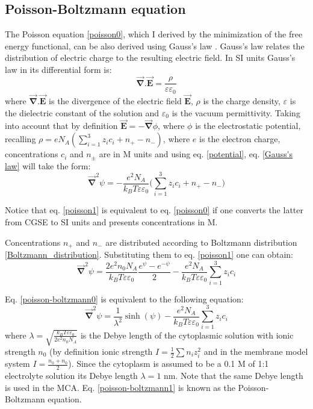 \subsection{Poisson-Boltzmann equation}

The Poisson equation \eqref{poisson0}, which I derived by the minimization of the free energy functional, can be also derived using Gauss's law \cite{Jackson1999}. Gauss's law relates the distribution of electric charge to the resulting electric field. In SI units Gauss's law in its differential form is:
\begin{equation}
 \label{Gauss's law}\vec{\mathbf{\nabla}}. \vec{\mathbf{E}} = \frac{\rho}{\varepsilon\varepsilon_0}
\end{equation}
where $\vec{\mathbf{\nabla}}. \vec{\mathbf{E}}$ is the divergence of the electric field $\vec{\mathbf{E}}$, $\rho$ is the charge density, $\varepsilon$ is the dielectric constant of the solution and $\varepsilon_0$ is the vacuum permittivity. Taking into account that by definition $\vec{\mathbf{E}}=-\vec{\mathbf{\nabla}}\phi$, where $\phi$ is the electrostatic potential, recalling $\rho=e N_A(\sum_{i=1}^3 z_i c_i + n_+ - n_-)$, where $e$ is the electron charge, concentrations $c_i$ and $n_{\pm}$ are in M units and using eq. \eqref{potential}, eq. \eqref{Gauss's law} will take the form:
\begin{equation}
 \label{poisson1}\vec{\mathbf{\nabla}}^2\psi=-\frac{e^2 N_A}{k_B T\varepsilon\varepsilon_0}\Big(\sum_{i=1}^3 z_i c_i + n_+ - n_-\Big)
\end{equation}

Notice that eq. \eqref{poisson1} is equivalent to eq. \eqref{poisson0} if one converts the latter from CGSE to SI units and presents concentrations in M.

Concentrations $n_+$ and $n_-$ are distributed according to Boltzmann distribution \eqref{Boltzmann_distribution}. Substituting them to eq. \eqref{poisson1} one can obtain:
\begin{equation}
\label{poisson-boltzmann0}\vec{\mathbf{\nabla}}^2 \psi=\frac{2e^2n_0 N_A}{k_B T\varepsilon\varepsilon_0}\frac{e^{\psi}-e^{-\psi}}{2} - \frac{e^2 N_A}{k_B T\varepsilon\varepsilon_0} \sum_{i=1}^3 z_i c_i
\end{equation}

Eq. \eqref{poisson-boltzmann0} is equivalent to the following equation:
\begin{equation}
\label{poisson-boltzmann1}\vec{\mathbf{\nabla}}^2 \psi=\frac{1}{\lambda^2}\sinh(\psi) - \frac{e^2 N_A}{k_B T\varepsilon\varepsilon_0} \sum_{i=1}^3 z_i c_i
\end{equation}
where $\lambda = \sqrt{\frac{k_BT\varepsilon\varepsilon_0}{2e^2n_0 N_A}}$ is the Debye length of the cytoplasmic solution with ionic strength $n_0$ (by definition ionic strength $I=\frac{1}{2}\sum n_i z_i^2$ and in the membrane model system $I=\frac{n_0+n_0}{2}$). Since the cytoplasm is assumed to be a 0.1 M of 1:1 electrolyte solution its Debye length $\lambda=1$ nm. Note that the same Debye length is used in the MCA. Eq. \eqref{poisson-boltzmann1} is known as the Poisson-Boltzmann equation.

